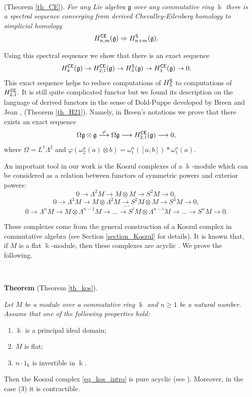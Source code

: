 \documentclass{amsart}
\numberwithin{equation}{section}
\theoremstyle{definition}
\def\gg{\mathfrak{g}}
\def\kk{\Bbbk}
\begin{document}
\ 

 (Theorem \ref{th_CE}). 
{\it For any Lie algebra $\gg$ over any commutative ring $\kk$ there is a spectral sequence converging from derived Chevalley-Eilenberg homology to simplicial homology
$$H_{n,m}^{\sf CE}(\gg) \Rightarrow H_{n+m}^{\sf S}(\gg).$$}



Using this spectral sequence we show that there is an exact sequence
$$H_4^{\sf CE}(\gg)\to H_{2,1}^{\sf CE}(\gg)\to H_3^{\sf S}(\gg)\to H_{3}^{\sf CE}(\gg)\to 0.$$ 
This exact sequence helps to reduce  computations of $H_3^{\sf S}$ to computations of $H_{2,1}^{\sf CE}.$ It is still quite complicated functor but we found its description on the language of derived functors in the sense of Dold-Puppe developed by Breen and Jean \cite{breen1999functorial}, \cite{jeanphdthesis} (Theorem \ref{th_H21}). 
Namely, in Breen's notations we prove that there exists an exact sequence \[
\Omega \gg \otimes \gg \overset{\varphi}\longrightarrow \Omega \gg \longrightarrow H_{2,1}^{\sf CE}(\gg) \longrightarrow 0,    
\]
where $\Omega=L^1 \Lambda^2$ and
$
\varphi( \omega^n_2(a)\otimes b )=\omega_1^n([a,b])*\omega_1^n(a).
$

An important tool in our work is the Koszul complexes of a $\kk$-module which can be considered as a relation between functors of symmetric powers and exterior powers:
$$ 0 \to \Lambda^2 M \to M\otimes M \to S^2 M \to 0,$$
$$0 \to \Lambda^3 M  \to M \otimes \Lambda^2 M \to S^2M \otimes M \to S^3 M \to 0,$$
$$\dots  $$
\begin{equation}\label{eq_kos_intro}
0 \to \Lambda^n M \to M\otimes \Lambda^{n-1}M \to \dots \to S^{i}M\otimes \Lambda^{n-i} M \to \dots \to S^nM \to 0.    
\end{equation}

These complexes come from the general construction of a Koszul complex in commutative algebra (see Section \ref{section_Koszul} for details). 
It is known that, if $M$ is a flat $\kk$-module, then these complexes are acyclic \cite{illusie2006complexe}. 
We prove the following.

\ 

{\bf Theorem} (Theorem \ref{th_kos}).  {\it Let $M$ be a module over a commutative ring $\kk$ and $n\geq 1$ be a natural number. Assume that one of the following properties hold: 
\begin{enumerate}
    \item $\kk$ is a principal ideal domain;
    \item $M$ is flat;
    \item  $n \cdot 1_\kk$ is invertible in $\kk.$
\end{enumerate}
Then the Koszul complex \eqref{eq_kos_intro} is pure acyclic (see \cite{emmanouil2016pure}). Moreover, in the case (3) it is contractible.}
\end{document}
